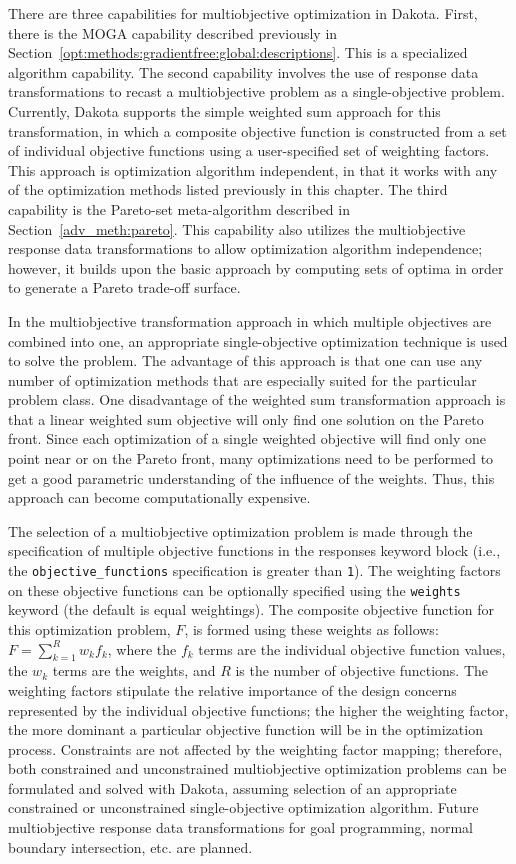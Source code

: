 There are three capabilities for multiobjective optimization in
Dakota. First, there is the MOGA capability described previously in
Section~\ref{opt:methods:gradientfree:global:descriptions}. This is a
specialized algorithm capability. The second capability involves the
use of response data transformations to recast a multiobjective
problem as a single-objective problem. Currently, Dakota supports the
simple weighted sum approach for this transformation, in which a
composite objective function is constructed from a set of individual
objective functions using a user-specified set of weighting
factors. This approach is optimization algorithm independent, in that
it works with any of the optimization methods listed previously in
this chapter.  The third capability is the Pareto-set meta-algorithm
described in Section~\ref{adv_meth:pareto}. This capability also
utilizes the multiobjective response data transformations to allow
optimization algorithm independence; however, it builds upon the basic
approach by computing sets of optima in order to generate a Pareto
trade-off surface.

In the multiobjective transformation approach in which multiple
objectives are combined into one, an appropriate single-objective
optimization technique is used to solve the problem. The advantage of
this approach is that one can use any number of optimization methods
that are especially suited for the particular problem class. One
disadvantage of the weighted sum transformation approach is that a
linear weighted sum objective will only find one solution on the
Pareto front.  Since each optimization of a single weighted objective
will find only one point near or on the Pareto front, many
optimizations need to be performed to get a good parametric
understanding of the influence of the weights.  Thus, this approach
can become computationally expensive.

The selection of a multiobjective optimization problem is made through
the specification of multiple objective functions in the responses
keyword block (i.e., the \texttt{objective\_functions} specification
is greater than \texttt{1}). The weighting factors on these objective
functions can be optionally specified using the \texttt{weights}
keyword (the default is equal weightings). The composite objective
function for this optimization problem, $F$, is formed using these
weights as follows: $F=\sum_{k=1}^{R}w_{k}f_{k}$, where the $f_{k}$
terms are the individual objective function values, the $w_{k}$ terms
are the weights, and $R$ is the number of objective functions. The
weighting factors stipulate the relative importance of the design
concerns represented by the individual objective functions; the higher
the weighting factor, the more dominant a particular objective
function will be in the optimization process. Constraints are not
affected by the weighting factor mapping; therefore, both constrained
and unconstrained multiobjective optimization problems can be
formulated and solved with Dakota, assuming selection of an
appropriate constrained or unconstrained single-objective optimization
algorithm.  Future multiobjective response data transformations for
goal programming, normal boundary intersection, etc. are planned.

